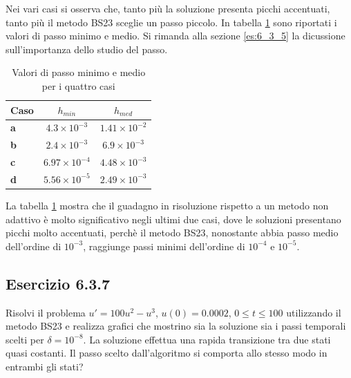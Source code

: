 \documentclass[letterpaper, 12pt]{article}
\numberwithin{equation}{section}    %
\begin{document}
Nei vari casi si osserva che, tanto più la soluzione presenta picchi accentuati, tanto più il metodo BS23
sceglie un passo piccolo. In tabella \ref{tab:passi} sono riportati i valori di passo minimo e medio. 
Si rimanda alla sezione \ref{es:6_3_5} la dicussione sull'importanza dello studio del passo. \\
\begin{table}[!ht]
    \centering
    \caption{Valori di passo minimo e medio per i quattro casi}
    \label{tab:passi}
    \begin{tabular}{|l|c|c|}
        \hline
        \textbf{Caso} & \textbf{$h_{min}$} & \textbf{$h_{med}$} \\
        \hline
        \textbf{a} & $4.3 \times 10^{-3}$ & $1.41 \times 10^{-2}$ \\
        \textbf{b} & $2.4 \times 10^{-3}$ & $6.9 \times 10^{-3}$ \\
        \textbf{c} & $6.97 \times 10^{-4}$ & $4.48 \times 10^{-3}$ \\
        \textbf{d} & $5.56 \times 10^{-5}$ & $2.49 \times 10^{-3}$ \\
        \hline
    \end{tabular}
\end{table}

La tabella \ref{tab:passi} mostra che il guadagno in risoluzione rispetto a un metodo non adattivo è 
molto significativo negli 
ultimi due casi, dove le soluzioni presentano picchi molto accentuati, perchè il metodo BS23, nonostante abbia 
passo medio dell'ordine di $10^{-3}$, raggiunge passi minimi dell'ordine di $10^{-4}$ e $10^{-5}$. 

\subsection{Esercizio 6.3.7}
Risolvi il problema $u'=100u^2-u^3$, $u(0)=0.0002$, $0\le t \le 100$ utilizzando il metodo BS23 e 
realizza grafici che mostrino sia la soluzione sia i passi temporali scelti per $\delta=10^{-8}$. 
La soluzione effettua una rapida transizione tra due stati quasi costanti. Il passo scelto dall'algoritmo 
si comporta allo stesso modo in entrambi gli stati?
\end{document}
